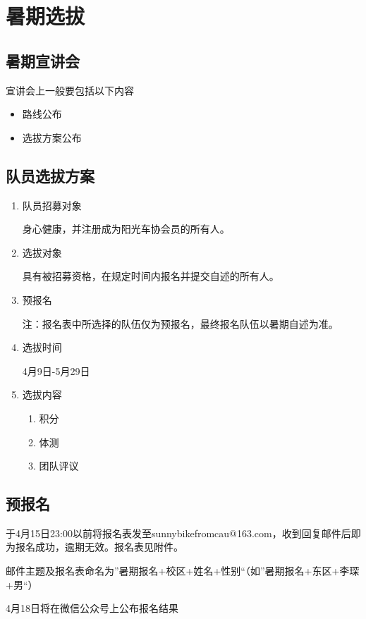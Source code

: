 \documentclass{ctexbook}
\begin{document}
\section{暑期选拔}
\subsection{暑期宣讲会}
宣讲会上一般要包括以下内容
\begin{itemize}
    \item 路线公布
    \item 选拔方案公布
\end{itemize}
\subsection{队员选拔方案}
\begin{enumerate}[label={\chinese*、}]

\item 队员招募对象

身心健康，并注册成为阳光车协会员的所有人。
\item 选拔对象

具有被招募资格，在规定时间内报名并提交自述的所有人。
\item 预报名

注：报名表中所选择的队伍仅为预报名，最终报名队伍以暑期自述为准。
\item  选拔时间

4月9日-5月29日
\item 选拔内容
\begin{enumerate}
\item 积分

\item 体测

\item 团队评议

\end{enumerate}

\end{enumerate}

\subsection{预报名}
于4月15日23:00以前将报名表发至sunnybikefromcau@163.com，收到回复邮件后即为报名成功，逾期无效。报名表见附件。

邮件主题及报名表命名为''暑期报名+校区+姓名+性别``（如''暑期报名+东区+李琛+男``）

4月18日将在微信公众号上公布报名结果
\end{document}
